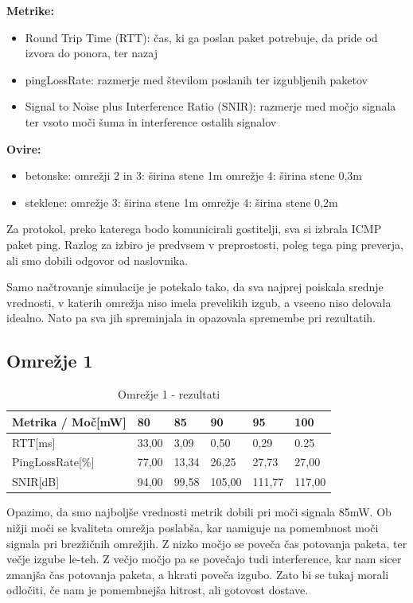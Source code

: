 \documentclass[11pt,a4paper,slovene]{myarticle}
\begin{document}
\textbf{Metrike:}
\begin{itemize}
	\item Round Trip Time (RTT): čas, ki ga poslan paket potrebuje, da pride od izvora do ponora, ter nazaj
	\item pingLossRate: razmerje med številom poslanih ter izgubljenih paketov
	\item Signal to Noise plus Interference Ratio (SNIR): razmerje med močjo signala ter vsoto moči šuma in interference ostalih signalov
\end{itemize}

\textbf{Ovire:}
\begin{itemize}
	\item betonske:
		\subitem omrežji 2 in 3: širina stene 1m
		\subitem omrežje 4: širina stene 0,3m
	\item steklene:
		\subitem omrežje 3: širina stene 1m
		\subitem omrežje 4: širina stene 0,2m
\end{itemize}

Za protokol, preko katerega bodo komunicirali gostitelji, sva si izbrala ICMP paket ping. Razlog za izbiro je predvsem v preprostosti, poleg tega ping preverja, ali smo dobili odgovor od naslovnika.

Samo načtrovanje simulacije je potekalo tako, da sva najprej poiskala srednje vrednosti, v katerih omrežja niso imela prevelikih izgub, a vseeno niso delovala idealno. Nato pa sva jih spreminjala in opazovala spremembe pri rezultatih.

\subsection{Omrežje 1}
\begin{table}[h]
	\centering
		\begin{tabular}{| l | l | l | l | l | l |}
			\hline
			Metrika / Moč[mW] & 80 & 85 & 90 & 95 & 100 \\
			\hline
			RTT[ms] & 33,00 & 3,09 & 0,50 & 0,29 & 0.25 \\
			\hline
			PingLossRate[\%] & 77,00 & 13,34 & 26,25 & 27,73 & 27,00 \\
			\hline
			SNIR[dB] & 94,00 & 99,58 & 105,00 & 111,77 & 117,00 \\
			\hline
		\end{tabular}
	\caption{Omrežje 1 - rezultati}
	\label{tab:om1rezultati}
\end{table}
Opazimo, da smo najboljše vrednosti metrik dobili pri moči signala 85mW.
Ob nižji moči se kvaliteta omrežja poslabša, kar namiguje na pomembnost moči signala pri brezžičnih omrežjih. Z nizko močjo se poveča čas potovanja paketa, ter večje izgube le-teh.
Z večjo močjo pa se povečajo tudi interference, kar nam sicer zmanjša čas potovanja paketa, a hkrati poveča izgubo. Zato bi se tukaj morali odločiti, če nam je pomembnejša hitrost, ali gotovost dostave.
\end{document}
